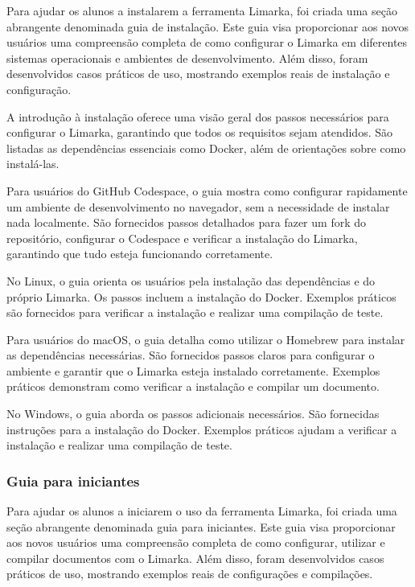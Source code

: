 \documentclass[
	12pt,				%
	oneside,			%
	a4paper,			%
	english,			%
	french,				%
	spanish,			%
	brazil				%
	]{abntex2}
\begin{document}
Para ajudar os alunos a instalarem a ferramenta Limarka, foi criada uma
seção abrangente denominada guia de instalação. Este guia visa
proporcionar aos novos usuários uma compreensão completa de como
configurar o Limarka em diferentes sistemas operacionais e ambientes de
desenvolvimento. Além disso, foram desenvolvidos casos práticos de uso,
mostrando exemplos reais de instalação e configuração.

A introdução à instalação oferece uma visão geral dos passos necessários
para configurar o Limarka, garantindo que todos os requisitos sejam
atendidos. São listadas as dependências essenciais como Docker, além de
orientações sobre como instalá-las.

Para usuários do GitHub Codespace, o guia mostra como configurar
rapidamente um ambiente de desenvolvimento no navegador, sem a
necessidade de instalar nada localmente. São fornecidos passos
detalhados para fazer um fork do repositório, configurar o Codespace e
verificar a instalação do Limarka, garantindo que tudo esteja
funcionando corretamente.

No Linux, o guia orienta os usuários pela instalação das dependências e
do próprio Limarka. Os passos incluem a instalação do Docker. Exemplos
práticos são fornecidos para verificar a instalação e realizar uma
compilação de teste.

Para usuários do macOS, o guia detalha como utilizar o Homebrew para
instalar as dependências necessárias. São fornecidos passos claros para
configurar o ambiente e garantir que o Limarka esteja instalado
corretamente. Exemplos práticos demonstram como verificar a instalação e
compilar um documento.

No Windows, o guia aborda os passos adicionais necessários. São
fornecidas instruções para a instalação do Docker. Exemplos práticos
ajudam a verificar a instalação e realizar uma compilação de teste.

\hypertarget{guia-para-iniciantes}{%
\subsubsection{Guia para iniciantes}\label{guia-para-iniciantes}}

Para ajudar os alunos a iniciarem o uso da ferramenta Limarka, foi
criada uma seção abrangente denominada guia para iniciantes. Este guia
visa proporcionar aos novos usuários uma compreensão completa de como
configurar, utilizar e compilar documentos com o Limarka. Além disso,
foram desenvolvidos casos práticos de uso, mostrando exemplos reais de
configurações e compilações.
\end{document}
